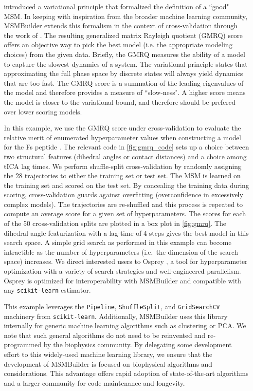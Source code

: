 \citet{2014-noe-variational} introduced a variational principle that
formalized the definition of a ``good" MSM. In keeping with inspiration
from the broader machine learning community, MSMBuilder extends this
formalism in the context of cross-validation through the work of
\citet{2015-gmrq}. The resulting generalized matrix Rayleigh
quotient (GMRQ) score offers an objective way to pick the best model (i.e. the
appropriate modeling choices) from the given data. Briefly, the GMRQ measures
the ability of a model to capture the slowest dynamics of a system. The
variational principle states that approximating the full phase space
by discrete states  will always yield dynamics that are too fast.
The GMRQ score is a summation of the leading eigenvalues of the model
and therefore provides a measure of ``slow-ness".
A higher score means the model is closer to the variational bound, and
therefore should be prefered over lower scoring models.

In this example, we use the GMRQ score under cross-validation to evaluate
the relative merit of enumerated hyperparameter values when constructing a
model for the Fs peptide \cite{2014-fs-peptide}. The relevant code in
\cref{fig:gmrq_code} sets up a choice between two structural features
(dihedral angles or contact distances) and a choice among tICA lag times.
We perform shuffle-split cross-validation by randomly assigning the 28
trajectories to either the training set or test set. The MSM is learned on
the training set and scored on the test set. By concealing the training
data during scoring, cross-validation guards against overfitting
(overconfidence in excessively complex models). The trajectories are
re-shuffled and this process is repeated to compute an average score for a
given set of hyperparameters.  The scores for each of the 50
cross-validation splits are plotted in a box plot in \cref{fig:gmrq}.
The dihedral angle featurization with a lag-time of 4 steps gives the best model in this
search space.  A simple grid search as performed in this example can become
intractible as the number of hyperparameters (i.e.~the dimension of the
search space) increases. We direct interested users to Osprey
\cite{2016-osprey}, a tool for hyperparameter optimization with a variety
of search strategies and well-engineered parallelism. Osprey is optimized
for interoperability with MSMBuilder and compatible with any \texttt{scikit-learn}
estimator.

This example leverages the \texttt{Pipeline}, \texttt{ShuffleSplit}, and
\texttt{GridSearchCV} machinery from \texttt{scikit-learn}. Additionally,
MSMBuilder uses this library internally for generic machine learning
algorithms such as clustering or PCA. We note that such general algorithms
do not need to be reinvented and re-programmed by the biophysics community.
By delegating some development effort to this widely-used machine learning
library, we ensure that the development of MSMBuilder is focused on
biophysical algorithms and considerations. This advantage offers rapid
adoption of state-of-the-art algorithms and a larger community for code
maintenance and longevity.

